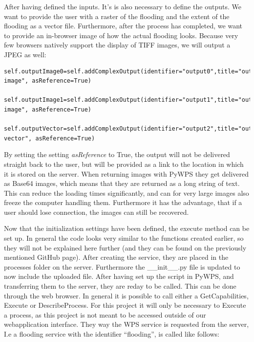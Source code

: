 After having defined the inputs. It's is also necessary to define the outputs. We want to provide the user with a raster of the flooding and the extent of the flooding as a vector file. Furthermore, after the process has completed, we want to provide an in-browser image of how the actual flooding looks. Because very few browsers natively support the display of TIFF images, we will output a JPEG as well:\\


\begin{lstlisting}
self.outputImage0=self.addComplexOutput(identifier="output0",title="output image", asReference=True)

self.outputImage1=self.addComplexOutput(identifier="output1",title="output image", asReference=True)

self.outputVector=self.addComplexOutput(identifier="output2",title="output vector", asReference=True)

\end{lstlisting}

By setting the setting \textit{asReference} to True, the output will not be delivered straight back to the user, but will be provided as a link to the location in which it is stored on the server. When returning images with PyWPS they get delivered as Base64 images, which means that they are returned as a long string of text. This can reduce the loading times significantly, and can for very large images also freeze the computer handling them. Furthermore it has the advantage, that if a user should lose connection, the images can still be recovered. 

Now that the initialization settings have been defined, the execute method can be set up. In general the code looks very similar to the functions created earlier, so they will not be explained here further (and they can be found on the previously mentioned GitHub page). 
After creating the service, they are placed in the processes folder on the server. Furthermore the __init__.py file is updated to now include the uploaded file. 
After having set up the script in PyWPS, and transferring them to the server, they are reday to be called. This can be done through the web browser.
In general it is possible to call either a GetCapabilities, Execute or DescribeProcess. For this project it will only be necessary to Execute a process, as this project is not meant to be accessed outside of our webapplication interface. 
They way the WPS service is requested from the server, I.e a flooding service with the identifier “flooding”, is called like follows:

